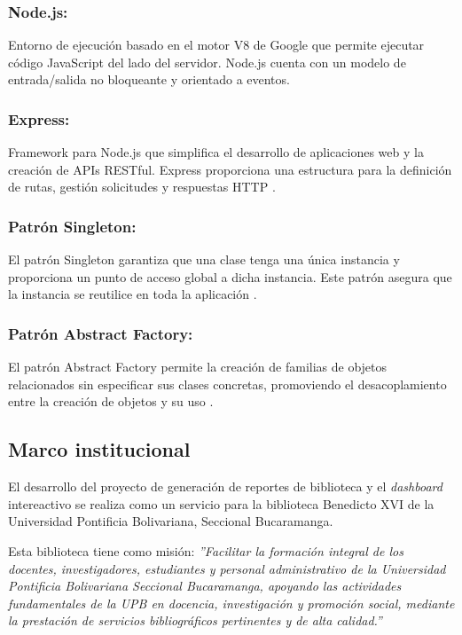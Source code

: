 \documentclass[spanish]{ieee_upb}
\begin{document}
  \subsubsection{Node.js:} Entorno de ejecución basado en el motor V8 de Google que permite ejecutar código JavaScript del lado del servidor. Node.js cuenta con un modelo de entrada/salida no bloqueante y orientado a eventos\cite{nodejs_2020}.
  
  \subsubsection{Express:} Framework para Node.js que simplifica el desarrollo de aplicaciones web y la creación de APIs RESTful. Express proporciona una estructura para la definición de  rutas, gestión solicitudes y respuestas HTTP \cite{express_framework_2020}.

    \subsubsection{Patrón Singleton:} El patrón Singleton garantiza que una clase tenga una única instancia y proporciona un punto de acceso global a dicha instancia. Este patrón asegura que la instancia se reutilice en toda la aplicación \cite{gamma1994design}.
  
  \subsubsection{Patrón Abstract Factory:} El patrón Abstract Factory permite la creación de familias de objetos relacionados sin especificar sus clases concretas, promoviendo el desacoplamiento entre la creación de objetos y su uso \cite{gamma1994design}.



\subsection{Marco institucional}


El desarrollo del proyecto de generación de reportes de biblioteca y el \textit{dashboard} intereactivo se realiza como un servicio para la biblioteca Benedicto XVI de la Universidad Pontificia Bolivariana, Seccional Bucaramanga.

Esta biblioteca tiene como misión:
\textit{''Facilitar la formación integral de los docentes, investigadores, estudiantes y personal administrativo de la Universidad Pontificia Bolivariana Seccional Bucaramanga, apoyando las actividades fundamentales de la UPB en docencia, investigación y promoción social, mediante la prestación de servicios bibliográficos pertinentes y de alta calidad.''}\cite{UPB_Biblioteca}
\end{document}
